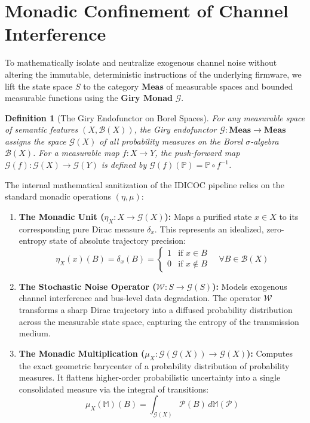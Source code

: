 \documentclass[11pt,a4paper]{article}
\newtheorem{definition}[theorem]{Definition}
\begin{document}
\section{Monadic Confinement of Channel Interference}
To mathematically isolate and neutralize exogenous channel noise without altering the immutable, deterministic instructions of the underlying firmware, we lift the state space $S$ to the category $\mathbf{Meas}$ of measurable spaces and bounded measurable functions using the \textbf{Giry Monad} $\mathcal{G}$.

\begin{definition}[The Giry Endofunctor on Borel Spaces]
For any measurable space of semantic features $(X, \mathcal{B}(X))$, the Giry endofunctor $\mathcal{G}: \mathbf{Meas} \to \mathbf{Meas}$ assigns the space $\mathcal{G}(X)$ of all probability measures on the Borel $\sigma$-algebra $\mathcal{B}(X)$. For a measurable map $f: X \to Y$, the push-forward map $\mathcal{G}(f): \mathcal{G}(X) \to \mathcal{G}(Y)$ is defined by $\mathcal{G}(f)(\mathbb{P}) = \mathbb{P} \circ f^{-1}$.
\end{definition}

The internal mathematical sanitization of the IDICOC pipeline relies on the standard monadic operations $(\eta, \mu)$:
\begin{enumerate}
    \item \textbf{The Monadic Unit ($\eta_X: X \to \mathcal{G}(X)$):} Maps a purified state $x \in X$ to its corresponding pure Dirac measure $\delta_x$. This represents an idealized, zero-entropy state of absolute trajectory precision:
    \begin{equation}
        \eta_X(x)(B) = \delta_x(B) = \begin{cases} 1 & \text{if } x \in B \\ 0 & \text{if } x \notin B \end{cases} \quad \forall B \in \mathcal{B}(X)
    \end{equation}

    \item \textbf{The Stochastic Noise Operator ($\mathcal{W}: S \to \mathcal{G}(S)$):} Models exogenous channel interference and bus-level data degradation. The operator $\mathcal{W}$ transforms a sharp Dirac trajectory into a diffused probability distribution across the measurable state space, capturing the entropy of the transmission medium.

    \item \textbf{The Monadic Multiplication ($\mu_X: \mathcal{G}(\mathcal{G}(X)) \to \mathcal{G}(X)$):} Computes the exact geometric barycenter of a probability distribution of probability measures. It flattens higher-order probabilistic uncertainty into a single consolidated measure via the integral of transitions:
    \begin{equation}
        \mu_X(\mathbb{M})(B) = \int_{\mathcal{G}(X)} \mathcal{P}(B) \, d\mathbb{M}(\mathcal{P})
    \end{equation}
\end{enumerate}
\end{document}
